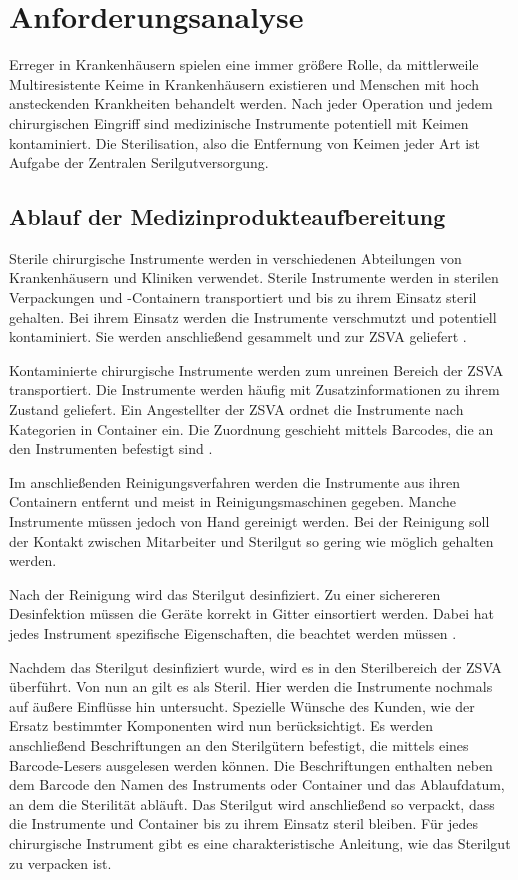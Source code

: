 \chapter{Anforderungsanalyse}
\label{ch:Anforderungsanalyse}
Erreger in Krankenhäusern spielen eine immer größere Rolle, da mittlerweile Multiresistente Keime in Krankenhäusern existieren \cite{Niknam2017} und Menschen mit hoch ansteckenden Krankheiten behandelt werden. Nach jeder Operation und jedem chirurgischen Eingriff sind medizinische Instrumente potentiell mit Keimen kontaminiert. Die Sterilisation, also die Entfernung von Keimen jeder Art ist Aufgabe der Zentralen Serilgutversorgung. 
%
%
\section{Ablauf der Medizinprodukteaufbereitung}
\label{sec:Ablauf_der_Medizinprodukteaufbereitung}
Sterile chirurgische Instrumente werden in verschiedenen Abteilungen von Krankenhäusern und Kliniken verwendet. Sterile Instrumente werden in sterilen Verpackungen und -Containern transportiert und bis zu ihrem Einsatz steril gehalten. Bei ihrem Einsatz werden die Instrumente verschmutzt und potentiell kontaminiert. Sie werden anschließend gesammelt und zur ZSVA geliefert \cite[S.~7]{Ruther2014}.

Kontaminierte chirurgische Instrumente werden zum unreinen Bereich der ZSVA transportiert. Die Instrumente werden häufig mit Zusatzinformationen zu ihrem Zustand geliefert. Ein Angestellter der ZSVA ordnet die Instrumente nach Kategorien in Container ein. Die Zuordnung geschieht mittels Barcodes, die an den Instrumenten befestigt sind \cite[S.~9]{Ruther2014}.

Im anschließenden Reinigungsverfahren werden die Instrumente aus ihren Containern entfernt und meist in Reinigungsmaschinen gegeben. Manche Instrumente müssen jedoch von Hand gereinigt werden. Bei der Reinigung soll der Kontakt zwischen Mitarbeiter und Sterilgut so gering wie möglich gehalten werden. 

Nach der Reinigung wird das Sterilgut desinfiziert. Zu einer sichereren Desinfektion müssen die Geräte korrekt in Gitter einsortiert werden. Dabei hat jedes Instrument spezifische Eigenschaften, die beachtet werden müssen \cite[S.~11]{Ruther2014}.

Nachdem das Sterilgut desinfiziert wurde, wird es in den Sterilbereich der ZSVA überführt. Von nun an gilt es als Steril. Hier werden die Instrumente nochmals auf äußere Einflüsse hin untersucht. Spezielle Wünsche des Kunden, wie der Ersatz bestimmter Komponenten wird nun berücksichtigt. Es werden anschließend Beschriftungen an den Sterilgütern befestigt, die mittels eines Barcode-Lesers ausgelesen werden können.
Die Beschriftungen enthalten neben dem Barcode den Namen des Instruments oder Container und das Ablaufdatum, an dem die Sterilität abläuft. Das Sterilgut wird anschließend so verpackt, dass die Instrumente und Container bis zu ihrem Einsatz steril bleiben. Für jedes chirurgische Instrument gibt es eine charakteristische Anleitung, wie das Sterilgut zu verpacken ist.


